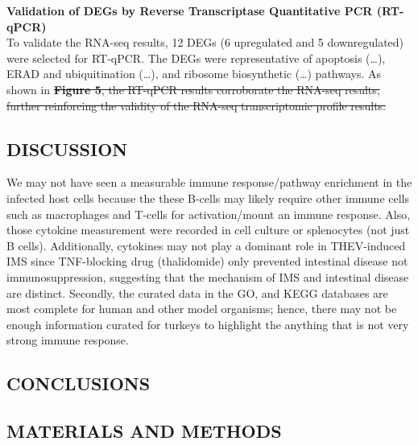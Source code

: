 \documentclass[
]{article}
\begin{document}
\textbf{Validation of DEGs by Reverse Transcriptase Quantitative PCR
(RT-qPCR)}\\
To validate the RNA-seq results, 12 DEGs (6 upregulated and 5
downregulated) were selected for RT-qPCR. The DEGs were representative
of apoptosis (\ldots), ERAD and ubiquitination (\ldots), and ribosome
biosynthetic (\ldots) pathways. As shown in \st{\textbf{Figure 5}, the
RT-qPCR results corroborate the RNA-seq results, further reinforcing the
validity of the RNA-seq transcriptomic profile results.} \newpage

\subsection{DISCUSSION}\label{discussion}

We may not have seen a measurable immune response/pathway enrichment in
the infected host cells because the these B-cells may likely require
other immune cells such as macrophages and T-cells for activation/mount
an immune response. Also, those cytokine measurement were recorded in
cell culture or splenocytes (not just B cells). Additionally, cytokines
may not play a dominant role in THEV-induced IMS since TNF-blocking drug
(thalidomide) only prevented intestinal disease not immunosuppression,
suggesting that the mechanism of IMS and intestinal disease are
distinct. Secondly, the curated data in the GO, and KEGG databases are
most complete for human and other model organisms; hence, there may not
be enough information curated for turkeys to highlight the anything that
is not very strong immune response. \newpage

\subsection{CONCLUSIONS}\label{conclusions}

\newpage

\subsection{MATERIALS AND METHODS}\label{materials-and-methods}
\end{document}
